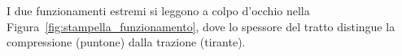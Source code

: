 \begin{esercizio}
\begin{svolgimento}



	
	
	\medskip\noindent
	I due funzionamenti estremi si leggono a colpo d'occhio nella
	Figura~\ref{fig:stampella_funzionamento}, dove lo spessore del tratto distingue
	la compressione (puntone) dalla trazione (tirante).
	



	\end{svolgimento}
	\end{esercizio}
	
